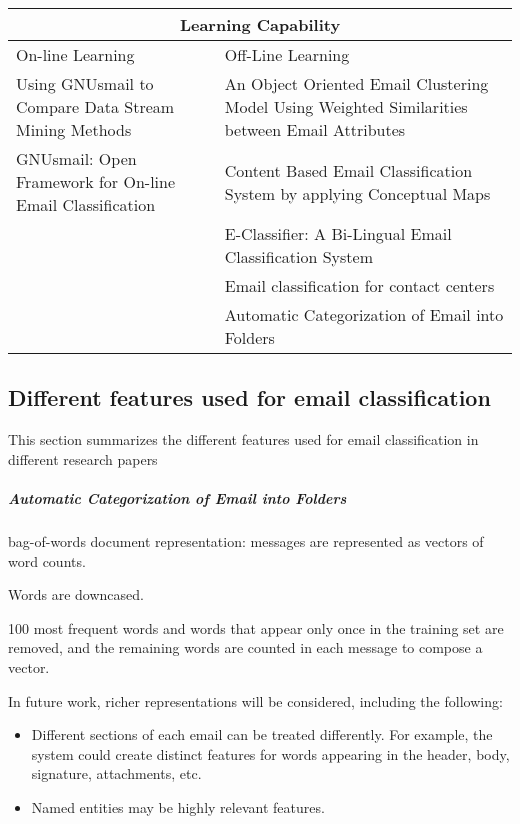 \begin{center}
\begin{tabular}{|p{6cm}|p{6cm}|}
\hline
\multicolumn{2}{|c|}{Learning Capability} \\
\hline
On-line Learning & Off-Line Learning 
\\ \hline
Using GNUsmail to Compare Data Stream Mining Methods \cite{JOSE11} &
An Object Oriented Email Clustering Model Using  Weighted Similarities 
between Email Attributes \cite{NARESH10}
\\ \hline

GNUsmail: Open Framework for On-line Email Classification \cite{MANUEL11}
& Content Based Email Classification System by applying Conceptual Maps \cite{BASKARAN09}
\\ \hline

& E-Classifier: A Bi-Lingual Email Classification System \cite{NOUF08}
\\ \hline

& Email classification for contact centers \cite{ANI03}
\\ \hline

& 
Automatic Categorization of Email into Folders \cite{RON04}

\\ \hline

\end{tabular}
\end{center}



\subsection{Different features used for email classification}
This section summarizes the different features used for email classification in different research papers
    \subparagraph{Automatic Categorization of Email into Folders \cite{RON04}}
	\begin{my_itemize}
		\item bag-of-words document representation: messages are represented as vectors of word counts.
		\item Words are downcased.
		\item 100 most frequent words and words that appear only once in the training set are removed, and the remaining words are counted in each message to compose a vector.
		\item In future work, richer representations will be considered, including the following:
			\begin{itemize}
				\item Different sections of each email can be treated differently. For example, the system could create distinct features for words appearing in the header, body, signature, attachments, etc.
				\item Named entities may be highly relevant features.
			\end{itemize}
	\end{my_itemize}

